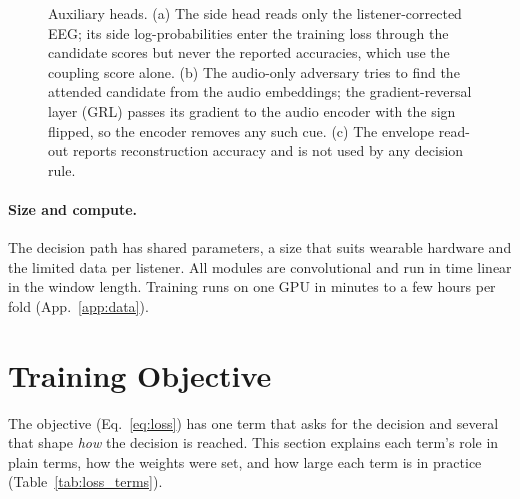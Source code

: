 \documentclass[10pt,twocolumn,letterpaper]{article}
\begin{document}
\begin{figure}[t]\centering
\resizebox{\textwidth}{!}{}
\caption{Auxiliary heads. (a) The side head reads only the listener-corrected EEG; its side
log-probabilities enter the training loss through the candidate scores but never the
reported accuracies, which use the coupling score alone. (b) The audio-only adversary tries
to find the attended candidate from the audio embeddings; the gradient-reversal layer (GRL)
passes its gradient to the audio encoder with the sign flipped, so the encoder removes any
such cue. (c) The envelope read-out reports reconstruction accuracy and is not used by any
decision rule.}\label{fig:net_aux}
\end{figure}

\paragraph{Size and compute.} The decision path has \archDecision{} shared parameters, a
size that suits wearable hardware and the limited data per listener. All modules are convolutional and run in time linear in the
window length. Training runs on one GPU in minutes to a few hours per fold
(App.~\ref{app:data}).

\section{Training Objective}\label{app:loss}
The objective (Eq.~\ref{eq:loss}) has one term that asks for the decision and several that
shape \emph{how} the decision is reached. This section explains each term's role in plain
terms, how the weights were set, and how large each term is in practice
(Table~\ref{tab:loss_terms}).
\end{document}
